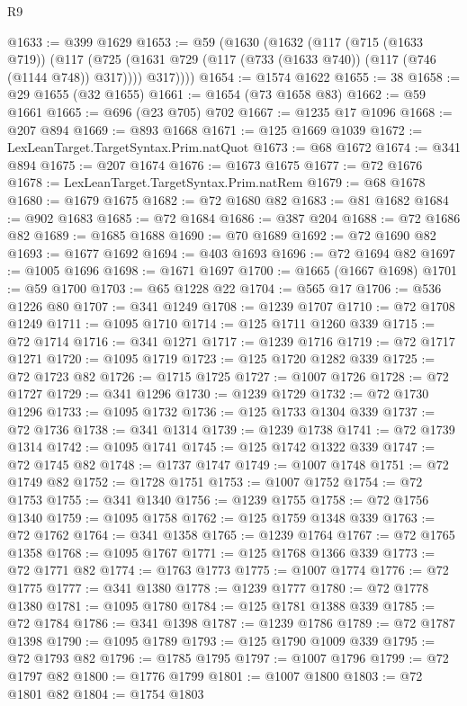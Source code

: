 \begin{lexlean}{R9}
\begin{coremodule}
@1633 := @399 @1629
@1653 := @59
    (@1630
      (@1632
        (@117
          (@715 (@1633 @719))
          (@117
            (@725 (@1631 @729 (@117 (@733 (@1633 @740)) (@117 (@746 (@1144 @748)) @317))))
            @317))))
@1654 := @1574 @1622
@1655 := 38
@1658 := @29 @1655 (@32 @1655)
@1661 := @1654 (@73 @1658 @83)
@1662 := @59 @1661
@1665 := @696 (@23 @705) @702
@1667 := @1235 @17 @1096
@1668 := @207 @894
@1669 := @893 @1668
@1671 := @125 @1669 @1039
@1672 := LexLeanTarget.TargetSyntax.Prim.natQuot
@1673 := @68 @1672
@1674 := @341 @894
@1675 := @207 @1674
@1676 := @1673 @1675
@1677 := @72 @1676
@1678 := LexLeanTarget.TargetSyntax.Prim.natRem
@1679 := @68 @1678
@1680 := @1679 @1675
@1682 := @72 @1680 @82
@1683 := @81 @1682
@1684 := @902 @1683
@1685 := @72 @1684
@1686 := @387 @204
@1688 := @72 @1686 @82
@1689 := @1685 @1688
@1690 := @70 @1689
@1692 := @72 @1690 @82
@1693 := @1677 @1692
@1694 := @403 @1693
@1696 := @72 @1694 @82
@1697 := @1005 @1696
@1698 := @1671 @1697
@1700 := @1665 (@1667 @1698)
@1701 := @59 @1700
@1703 := @65 @1228 @22
@1704 := @565 @17
@1706 := @536 @1226 @80
@1707 := @341 @1249
@1708 := @1239 @1707
@1710 := @72 @1708 @1249
@1711 := @1095 @1710
@1714 := @125 @1711 @1260 @339
@1715 := @72 @1714
@1716 := @341 @1271
@1717 := @1239 @1716
@1719 := @72 @1717 @1271
@1720 := @1095 @1719
@1723 := @125 @1720 @1282 @339
@1725 := @72 @1723 @82
@1726 := @1715 @1725
@1727 := @1007 @1726
@1728 := @72 @1727
@1729 := @341 @1296
@1730 := @1239 @1729
@1732 := @72 @1730 @1296
@1733 := @1095 @1732
@1736 := @125 @1733 @1304 @339
@1737 := @72 @1736
@1738 := @341 @1314
@1739 := @1239 @1738
@1741 := @72 @1739 @1314
@1742 := @1095 @1741
@1745 := @125 @1742 @1322 @339
@1747 := @72 @1745 @82
@1748 := @1737 @1747
@1749 := @1007 @1748
@1751 := @72 @1749 @82
@1752 := @1728 @1751
@1753 := @1007 @1752
@1754 := @72 @1753
@1755 := @341 @1340
@1756 := @1239 @1755
@1758 := @72 @1756 @1340
@1759 := @1095 @1758
@1762 := @125 @1759 @1348 @339
@1763 := @72 @1762
@1764 := @341 @1358
@1765 := @1239 @1764
@1767 := @72 @1765 @1358
@1768 := @1095 @1767
@1771 := @125 @1768 @1366 @339
@1773 := @72 @1771 @82
@1774 := @1763 @1773
@1775 := @1007 @1774
@1776 := @72 @1775
@1777 := @341 @1380
@1778 := @1239 @1777
@1780 := @72 @1778 @1380
@1781 := @1095 @1780
@1784 := @125 @1781 @1388 @339
@1785 := @72 @1784
@1786 := @341 @1398
@1787 := @1239 @1786
@1789 := @72 @1787 @1398
@1790 := @1095 @1789
@1793 := @125 @1790 @1009 @339
@1795 := @72 @1793 @82
@1796 := @1785 @1795
@1797 := @1007 @1796
@1799 := @72 @1797 @82
@1800 := @1776 @1799
@1801 := @1007 @1800
@1803 := @72 @1801 @82
@1804 := @1754 @1803

\end{coremodule}
\end{lexlean}
